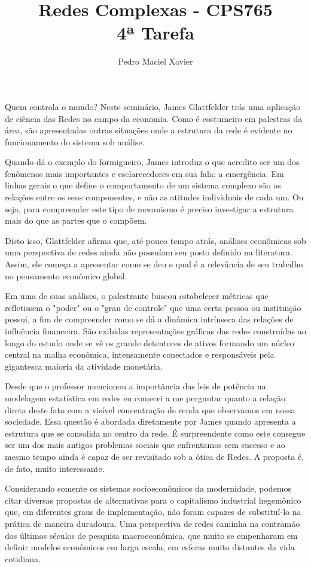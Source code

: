 \documentclass{homework}
\title{Redes Complexas - CPS765 \\[1ex]%
4ª Tarefa}
\author{Pedro Maciel Xavier}
\begin{document}
    \smaketitle %
    
    Quem controla o mundo? Neste seminário, James Glattfelder trás uma aplicação de ciência das Redes no campo da economia. Como é costumeiro em palestras da área, são apresentadas outras situações onde a estrutura da rede é evidente no funcionamento do sistema sob análise.\par
    
    Quando dá o exemplo do formigueiro, James introduz o que acredito ser um dos fenômenos mais importantes e esclarecedores em sua fala: a emergência. Em linhas gerais o que define o comportamento de um sistema complexo são as relações entre os seus componentes, e não as atitudes individuais de cada um. Ou seja, para compreender este tipo de mecanismo é preciso investigar a estrutura mais do que as partes que o compõem.\par
    
    Disto isso, Glattfelder afirma que, até pouco tempo atrás, análises econômicas sob uma perspectiva de redes ainda não possuíam seu posto definido na literatura. Assim, ele começa a apresentar como se deu e qual é a relevância de seu trabalho no pensamento econômico global.\par
    
    Em uma de suas análises, o palestrante buscou estabelecer métricas que refletissem o "poder" ou o "grau de controle" que uma certa pessoa ou instituição possui, a fim de compreender como se dá a dinâmica intrínseca das relações de influência financeira. São exibidas representações gráficas das redes construídas ao longo do estudo onde se vê os grande detentores de ativos formando um núcleo central na malha econômica, intensamente conectados e responsáveis pela gigantesca maioria da atividade monetária.\par
    
    Desde que o professor mencionou a importância das leis de potência na modelagem estatística em redes eu comecei a me perguntar quanto a relação direta deste fato com a visível concentração de renda que observamos em nossa sociedade. Essa questão é abordada diretamente por James quando apresenta a estrutura que se consolida no centro da rede. É surpreendente como este consegue ser um dos mais antigos problemas sociais que enfrentamos sem sucesso e ao mesmo tempo ainda é capaz de ser revisitado sob a ótica de Redes. A proposta é, de fato, muito interessante. \par
    
    Considerando somente os sistemas socioeconômicos da modernidade, podemos citar diversas propostas de alternativas para o capitalismo industrial hegemônico que, em diferentes graus de implementação, não foram capazes de substituí-lo na prática de maneira duradoura. Uma perspectiva de redes caminha na contramão dos últimos séculos de pesquisa macroeconômica, que muito se empenharam em definir modelos econômicos em larga escala, em esferas muito distantes da vida cotidiana.\par
    
\end{document}
